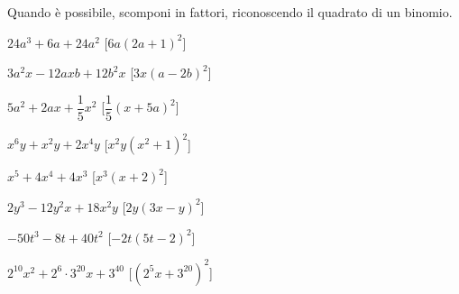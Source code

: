 \newpage %

\begin{esercizio}[\Ast]
\label{ese:div.021}
Quando è possibile, scomponi in fattori, riconoscendo il quadrato di un binomio.
\begin{multicols}{2}
\begin{enumeratea}
 \item $24a^{3}+6a+24a^{2}$ \hfill [$6a(2a+1)^{2}$]
 \item $3a^{2}x-12axb+12b^{2}x$ \hfill [$3x(a-2b)^{2}$]
 \item $5a^{2}+2ax+\dfrac{1}{5}x^{2}$ \hfill [$\dfrac{1}{5}(x+5a)^{2}$]
 \item $x^{6}y+x^{2}y+2x^{4}y$ \hfill [$x^{2}y\left(x^{2}+1\right)^{2}$]
 \item $x^{5}+4x^{4}+4x^{3}$ \hfill [$x^{3}(x+2)^{2}$]
 \item $2y^{3}-12y^{2}x+18x^{2}y$ \hfill [$2y(3x-y)^{2}$]
 \item $-50t^{3}-8t+40t^{2}$ \hfill [$-2t(5t-2)^{2}$]
 \item $2^{10}x^{2}+2^{6}\cdot 3^{20}x+3^{40}$ 
  \hfill [$\left(2^{5}x+3^{20}\right)^{2}$]
\end{enumeratea}
\end{multicols}
\end{esercizio}


\paragraph*{}


